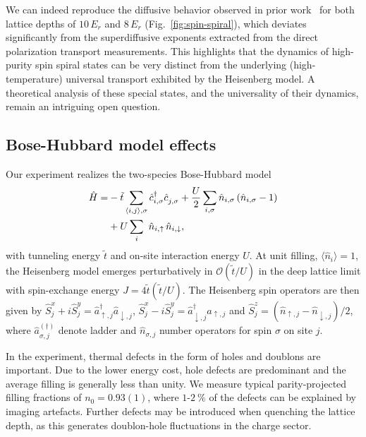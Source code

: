 \documentclass[
 reprint,
 superscriptaddress,
 amsmath,amssymb,
 aps,
 pra,
]{revtex4-2}
\newcommand{\avg}[1]{\ensuremath{\langle #1 \rangle}\xspace}%
\begin{document}
We can indeed reproduce the diffusive behavior observed in prior work~\cite{Hild2014} for both lattice depths of $10\,E_r$ and $8\,E_r$ (Fig.~\ref{fig:spin-spiral}), which deviates significantly from the superdiffusive exponents extracted from the direct polarization transport measurements. 
This highlights that the dynamics of high-purity spin spiral states can be very distinct from the underlying (high-temperature) universal transport exhibited by the Heisenberg model. 
A theoretical analysis of these special states, and the universality of their dynamics, remain an intriguing open question.


\subsection{Bose-Hubbard model effects}

Our experiment realizes the two-species Bose-Hubbard model
\begin{align} \begin{split}
    \hat{H} = &-\tilde{t} \sum_{\avg{i,j}, \sigma} \hat{c}_{i,\sigma}^\dagger \hat{c}_{j,\sigma}^{\mathstrut} 
     + \frac{U}{2} \sum_{i,\sigma} \hat{n}_{i,\sigma} \left(\hat{n}_{i,\sigma} - 1\right)\\
     & +U \sum_i \ \hat{n}_{i, \uparrow}\,\hat{n}_{i, \downarrow},
\end{split} \end{align}
with tunneling energy $\tilde{t}$ and on-site interaction energy $U$. At unit filling, $\avg{\hat{n}_i} = 1$, the Heisenberg model emerges perturbatively in $\mathcal{O} (\tilde{t} / U)$ in the deep lattice limit with spin-exchange energy $J = 4 \tilde{t} (\tilde{t} / U)$. The Heisenberg spin operators are then given by $\hat{S}_j^x + i \hat{S}_j^y = \hat{a}_{\uparrow,j}^\dagger \hat{a}_{\downarrow,j}$, $\hat{S}_j^x - i \hat{S}_j^y = \hat{a}_{\downarrow,j}^\dagger \hat{a}_{\uparrow,j}$ and $\hat{S}_j^z = (\hat{n}_{\uparrow,j} - \hat{n}_{\downarrow,j}) / 2$, where $\hat{a}_{\sigma,j}^{(\dagger)}$ denote ladder and $\hat{n}_{\sigma,j}$ number operators for spin $\sigma$ on site $j$.

In the experiment, thermal defects in the form of holes and doublons are important. Due to the lower energy cost, hole defects are predominant and the average filling is generally less than unity. We measure typical parity-projected filling fractions of $n_0 = 0.93 (1)$, where $1$-$\SI{2}{\percent}$ of the defects can be explained by imaging artefacts. Further defects may be introduced when quenching the lattice depth, as this generates doublon-hole fluctuations in the charge sector.
\end{document}
